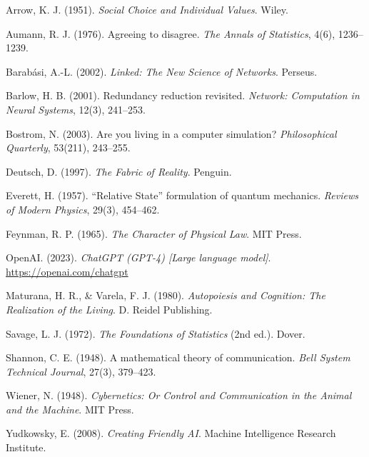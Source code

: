 \documentclass[12pt]{article}
\begin{document}
\begin{thebibliography}{99}

Arrow, K. J. (1951). \textit{Social Choice and Individual Values}. Wiley.

Aumann, R. J. (1976). Agreeing to disagree. \textit{The Annals of Statistics}, 4(6), 1236–1239.

Barabási, A.-L. (2002). \textit{Linked: The New Science of Networks}. Perseus.

Barlow, H. B. (2001). Redundancy reduction revisited. \textit{Network: Computation in Neural Systems}, 12(3), 241–253.

Bostrom, N. (2003). Are you living in a computer simulation? \textit{Philosophical Quarterly}, 53(211), 243–255.

Deutsch, D. (1997). \textit{The Fabric of Reality}. Penguin.

Everett, H. (1957). “Relative State” formulation of quantum mechanics. \textit{Reviews of Modern Physics}, 29(3), 454–462.

Feynman, R. P. (1965). \textit{The Character of Physical Law}. MIT Press.

OpenAI. (2023). \textit{ChatGPT (GPT-4) [Large language model]}. \url{https://openai.com/chatgpt}

Maturana, H. R., \& Varela, F. J. (1980). \textit{Autopoiesis and Cognition: The Realization of the Living}. D. Reidel Publishing.

Savage, L. J. (1972). \textit{The Foundations of Statistics} (2nd ed.). Dover.

Shannon, C. E. (1948). A mathematical theory of communication. \textit{Bell System Technical Journal}, 27(3), 379–423.

Wiener, N. (1948). \textit{Cybernetics: Or Control and Communication in the Animal and the Machine}. MIT Press.

Yudkowsky, E. (2008). \textit{Creating Friendly AI}. Machine Intelligence Research Institute.

\end{thebibliography}
\end{document}
